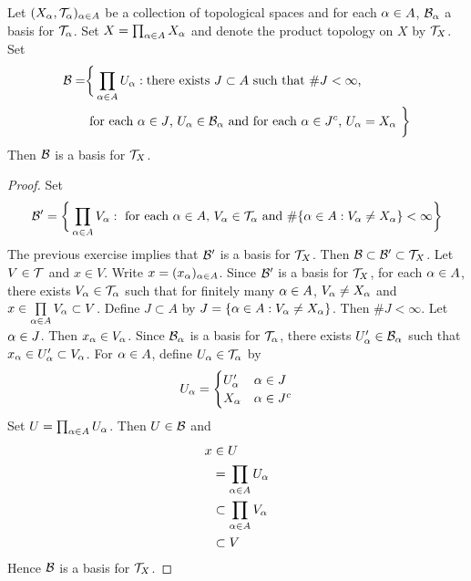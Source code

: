 \documentclass{book}
\begin{document}
	\begin{ex}  
		Let $(X_{\alpha}, \mathcal{T}_{\alpha})_{\alpha \in A}$ be a collection of topological spaces and for each $\alpha \in A$, $\mathcal{B}_{\alpha}$ a basis for $\mathcal{T}_{\alpha}$. Set $X = \prod_{\alpha \in A} X_{\alpha}$ and denote the product topology on $X$ by $\mathcal{T}_X$. Set 
		\begin{align*}
			\mathcal{B} = 
			& \bigg \{\prod_{\alpha \in A} U_{\alpha}: \text{there exists $J \subset A$ such that $ \# J < \infty$, } \\
			& \text{ for each $\alpha \in J$, $U_{\alpha} \in \mathcal{B}_{\alpha}$ and for each $\alpha \in J^c$, $U_{\alpha} = X_{\alpha}$ } \bigg \}
		\end{align*} 
		Then $\mathcal{B}$ is a basis for $\mathcal{T}_X$.
	\end{ex}

	\begin{proof}
		Set 
		$$\mathcal{B}' = \bigg \{\prod_{\alpha \in A}V_{\alpha}: \text{ for each $\alpha \in A$,  $V_{\alpha} \in \mathcal{T}_{\alpha}$ and $\# \{\alpha \in A: V_{\alpha} \neq X_{\alpha}\} < \infty$} \bigg\}$$
		The previous exercise implies that $\mathcal{B}'$ is a basis for $\mathcal{T}_X$. Then $\mathcal{B} \subset \mathcal{B}' \subset \mathcal{T}_X$. Let $V \in \mathcal{T}$ and $x \in V$. Write $x = (x_{\alpha})_{\alpha \in A}$. Since $\mathcal{B}'$ is a basis for $\mathcal{T}_X$, for each $\alpha \in A$, there exists $V_{\alpha} \in \mathcal{T}_{\alpha}$ such that for finitely many $\alpha \in A$, $V_{\alpha} \neq X_{\alpha}$ and $x \in \prod\limits_{\alpha \in A} V_{\alpha} \subset V$. Define $J \subset A$ by $J = \{\alpha \in A: V_{\alpha} \neq X_{\alpha}\}$. Then $\#J < \infty$. Let $\alpha \in J$. Then $x_{\alpha} \in V_{\alpha}$. Since $\mathcal{B}_{\alpha}$ is a basis for $\mathcal{T}_{\alpha}$, there exists $U'_{\alpha} \in \mathcal{B}_{\alpha}$ such that $x_{\alpha} \in U'_{\alpha} \subset V_{\alpha}$. For $\alpha \in A$, define $U_{\alpha} \in \mathcal{T}_{\alpha}$ by 
		\[
		U_{\alpha} =
		\begin{cases}
			U'_{\alpha} & \alpha \in J \\
			X_{\alpha} & \alpha \in J^c
		\end{cases}
		\]
		Set $U = \prod_{\alpha \in A} U_{\alpha}$. Then $U \in \mathcal{B}$ and 
		\begin{align*}
			x 
			& \in U \\
			& = \prod_{\alpha \in A} U_{\alpha} \\
			& \subset \prod\limits_{\alpha \in A} V_{\alpha} \\
			& \subset V
		\end{align*}
		Hence $\mathcal{B}$ is a basis for $\mathcal{T}_X$.
	\end{proof}
\end{document}
